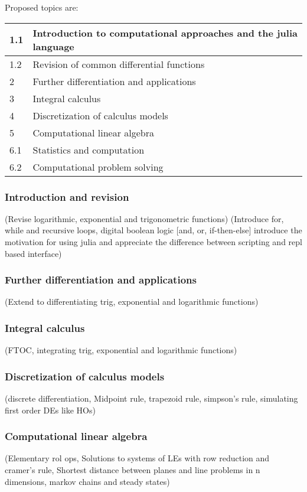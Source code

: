 \documentclass[12pt]{report}
\begin{document}
    Proposed topics are:
    \begin{table}[H]
        \centering
        \begin{tabular}{|l|l|}
        \hline
            1.1 & Introduction to computational approaches and the julia language\\ \hline
            1.2 & Revision of common differential functions\\ \hline
            2 & Further differentiation and applications \\ \hline
            3 & Integral calculus \\ \hline
            4 & Discretization of calculus models\\ \hline
            5 & Computational linear algebra \\ \hline
            6.1 & Statistics and computation \\ \hline
            6.2 & Computational problem solving \\ \hline
        \end{tabular}
    \end{table}

    \subsubsection{Introduction and revision} (Revise logarithmic, exponential and trigonometric functions) (Introduce for, while and recursive loops, digital boolean logic [and, or, if-then-else] introduce the motivation for using julia and appreciate the difference between scripting and repl based interface)
    \subsubsection{Further differentiation and applications} (Extend to differentiating trig, exponential and logarithmic functions)
    \subsubsection{Integral calculus} (FTOC, integrating trig, exponential and logarithmic functions)
    \subsubsection{Discretization of calculus models} (discrete differentiation, Midpoint rule, trapezoid rule, simpson's rule, simulating first order DEs like HOs)
    \subsubsection{Computational linear algebra} (Elementary rol ops, Solutions to systems of LEs with row reduction and cramer's rule, Shortest distance between planes and line problems in n dimensions, markov chains and steady states)
\end{document}
